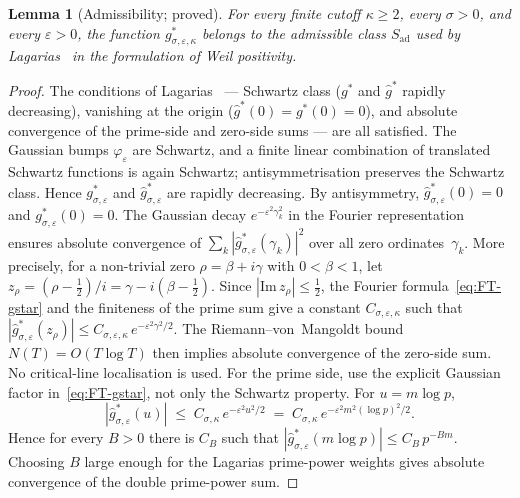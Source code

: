 \documentclass[11pt]{article}
\newtheorem{lemma}[theorem]{Lemma}
\newcommand{\Sad}{S_{\mathrm{ad}}}
\begin{document}
\begin{lemma}[Admissibility; proved]\label{lem:admissible}
For every finite cutoff $\kappa\ge 2$, every $\sigma>0$, and
every $\varepsilon>0$, the function
$g^*_{\sigma,\varepsilon,\kappa}$ belongs to the admissible
class $\Sad$
used by Lagarias~\cite{Lagarias} in the formulation of Weil
positivity.
\end{lemma}

\begin{proof}
The conditions of Lagarias~\cite{Lagarias} --- Schwartz class
($g^*$ and $\widehat g^*$ rapidly decreasing), vanishing at
the origin ($\widehat g^*(0)=g^*(0)=0$), and absolute
convergence of the prime-side and zero-side sums --- are all
satisfied.
The Gaussian bumps $\varphi_\varepsilon$ are Schwartz, and a
finite linear combination of translated Schwartz functions is
again Schwartz; antisymmetrisation preserves the Schwartz class.
Hence $g^*_{\sigma,\varepsilon}$ and
$\widehat g^*_{\sigma,\varepsilon}$ are rapidly decreasing.
By antisymmetry, $\widehat g^*_{\sigma,\varepsilon}(0)=0$ and
$g^*_{\sigma,\varepsilon}(0)=0$.
The Gaussian decay $e^{-\varepsilon^2\gamma_k^2}$ in the
Fourier representation ensures absolute convergence of
$\sum_k|\widehat g^*_{\sigma,\varepsilon}(\gamma_k)|^2$
over all zero ordinates~$\gamma_k$.
More precisely, for a non-trivial zero $\rho=\beta+i\gamma$
with $0<\beta<1$, let
$z_\rho=(\rho-\tfrac12)/i=\gamma-i(\beta-\tfrac12)$.
Since $|\mathrm{Im}\,z_\rho|\le\tfrac12$, the Fourier
formula~\eqref{eq:FT-gstar} and the finiteness of the prime
sum give a constant $C_{\sigma,\varepsilon,\kappa}$ such that
$|\widehat g^*_{\sigma,\varepsilon}(z_\rho)|
\le C_{\sigma,\varepsilon,\kappa}\,e^{-\varepsilon^2\gamma^2/2}$.
The Riemann--von~Mangoldt bound $N(T)=O(T\log T)$ then implies
absolute convergence of the zero-side sum.
No critical-line localisation is used.
For the prime side, use the explicit Gaussian factor
in~\eqref{eq:FT-gstar}, not only the Schwartz property.
For $u=m\log p$,
\[
|\widehat g^*_{\sigma,\varepsilon}(u)|
\;\le\; C_{\sigma,\kappa}\,e^{-\varepsilon^2 u^2/2}
\;=\; C_{\sigma,\kappa}\,e^{-\varepsilon^2 m^2(\log p)^2/2}.
\]
Hence for every $B>0$ there is $C_B$ such that
$|\widehat g^*_{\sigma,\varepsilon}(m\log p)|\le C_B\,p^{-Bm}$.
Choosing $B$ large enough for the Lagarias prime-power weights
gives absolute convergence of the double prime-power sum.
\end{proof}

\end{document}
